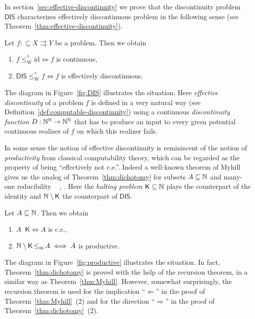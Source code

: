 \documentclass{amsart}
\def\IN{{\Bbb{N}}}
\def\TO{\Longrightarrow}
\def\In{\subseteq}
\def\mto{\rightrightarrows}
\def\K{{\mathsf{{K}}}}
\def\leqm{\mathop{\leq_{\mathrm{m}}}}
\def\leqm{\mathop{\leq_{\mathrm{m}}}}
\def\id{{\mathrm{id}}}
\def\DIS{\mathsf{DIS}}
\begin{document}
In section~\ref{sec:effective-discontinuity} we prove that the discontinuity problem $\DIS$ 
characterizes effectively discontinuous problem in the following sense (see Theorem~\ref{thm:effective-discontinuity}).

\begin{theorem}
\label{thm:dichotomy}
Let $f:\In X\mto Y$ be a problem. Then we obtain
\begin{enumerate}
\item $f\leq_\mathrm{W}^*\id\iff f$ is continuous,
\item $\DIS\leq_\mathrm{W}^*f\iff f$ is effectively discontinuous.
\end{enumerate}
\end{theorem}

The diagram in Figure~\ref{fig:DIS} illustrates the situation.
Here {\em effective discontinuity} of a problem $f$ is defined in a very natural way (see Definition~\ref{def:computable-discontinuity}) using a continuous {\em discontinuity function} $D:\IN^\IN\to\IN^\IN$ that has to produce an input to every given potential continuous realizer of $f$ on which this realizer fails. 

In some sense the notion of effective discontinuity is reminiscent of the notion of {\em productivity}
from classical computability theory, which can be regarded as the property of being ``effectively not c.e.''.
Indeed a well-known theorem of Myhill~\cite{Myh55} gives us the analog of Theorem~\ref{thm:dichotomy} for 
subsets $A\In\IN$ and many-one reducibility $\leqm$ \cite[Theorem~2.4.6]{Soa16}, \cite[Theorem~2.6.6]{Wei87}.
Here the {\em halting problem} $\K\In\IN$ plays the counterpart of the identity and $\IN\setminus\K$ the counterpart of $\DIS$.

\begin{theorem}[Myhill 1955]
\label{thm:Myhill}
Let $A\In\IN$. Then we obtain
\begin{enumerate}
\item $A\leqm \K\iff A$ is c.e.,
\item $\IN\setminus \K\leqm A\iff A$ is productive.
\end{enumerate}
\end{theorem}

The diagram in Figure~\ref{fig:productive} illustrates the situation.
In fact, Theorem~\ref{thm:dichotomy} is proved with the help of the recursion theorem, 
in a similar way as Theorem~\ref{thm:Myhill}. However, somewhat surprisingly, the recursion theorem is used
for the implication ``$\Longleftarrow$'' in the proof of Theorem~\ref{thm:Myhill}~(2) and for the direction ``$\TO$'' in the proof of Theorem~\ref{thm:dichotomy}~(2).
\end{document}
